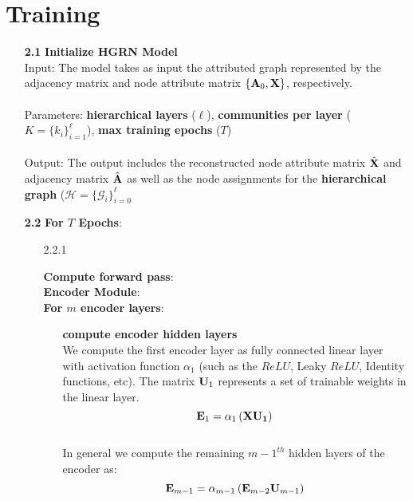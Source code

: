\documentclass[a4paper,12pt]{article}
\newcommand{\forceindent}{\leavevmode{\parindent=2em\indent}}
\begin{document}
	\section{Training}
	\begin{itemize}
	\item[\bf 2.1]{\textbf{Initialize HGRN Model} \\
		Input: The model takes as input the attributed graph represented by the adjacency matrix and node attribute matrix $\{{\bf A}_0, {\bf X}\}$, respectively. \\
		\\
		Parameters: \textbf{hierarchical layers} ($\ell$), \textbf{communities per layer} ($K =\{k_i\}_{i=1}^\ell$), \textbf{max training epochs} ($T$) \\
		\\
		Output: The output includes the reconstructed node attribute matrix $\hat{\bf X}$ and adjacency matrix $\hat{\bf A}$ as well as the node assignments for the \textbf{hierarchical graph} ($\mathcal{H} = \{\mathcal{G}_i\}_{i = 0}^\ell$
	}

	\item[\bf 2.2]{\textbf{For $T$ Epochs}:}
		\begin{enumerate}
			\item[2.2.1]{\textbf{Compute forward pass}: \\
			
			 \forceindent \textbf{Encoder Module}: \\
			 \forceindent \textbf{For $m$ encoder layers}: 
			\begin{enumerate}
				\item[]{\textbf{compute encoder hidden layers} \\
					We compute the first encoder layer as fully connected linear layer with activation function $\alpha_{1}$ (such as the $ReLU$, Leaky $ReLU$, Identity functions, etc). The matrix ${\bf U}_1$ represents a set of trainable weights in the linear layer. 
					\[{\bf E}_1 = \alpha_1\left({\bf X{\bf U}_1}\right)\]
					\\
					In general we compute the remaining $m-1^{th}$ hidden layers of the encoder as:
					\[{\bf E}_{m-1} = \alpha_{m-1}\left({\bf E}_{m-2}{\bf U}_{m-1}\right)\]}
				

\end{enumerate}}
\end{enumerate}
\end{itemize}
\end{document}
